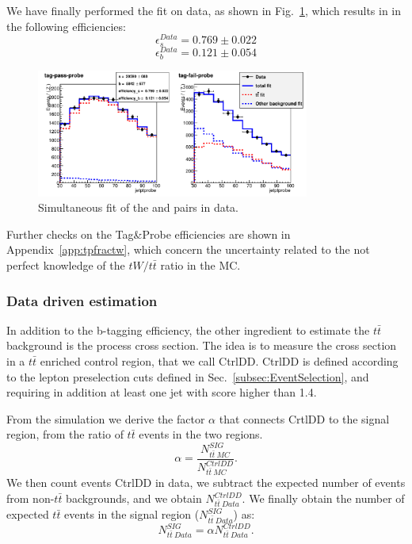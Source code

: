 We have finally performed the fit on data, as shown in Fig.~\ref{fig:data_tp}, which results in in the following efficiencies:
\begin{equation}
\epsilon_{s}^{Data}=0.769\pm0.022
\end{equation}
\begin{equation}
\epsilon_{b}^{Data}=0.121\pm0.054
\end{equation}

\begin{figure}[b]
\centering
\includegraphics[width=0.8\textwidth]{images/data_ptprobe.pdf}
\caption{Simultaneous fit of the \tpp{} and \tfp{} pairs in data.\label{fig:data_tp}}
\end{figure}
Further checks on the Tag\&Probe efficiencies are shown in Appendix~\ref{app:tpfractw}, which concern the uncertainty related to the not perfect knowledge of the $tW/t\bar{t}$ ratio in the MC.


\subsubsection{Data driven estimation \label{sec:DD}}
In addition to the b-tagging efficiency, the other ingredient to estimate the $t\bar{t}$ background is the process cross section. The idea is to measure the cross section in a $t\bar{t}$ enriched control region, that we call CtrlDD. CtrlDD is defined according to the lepton preselection cuts defined in Sec.~\ref{subsec:EventSelection}, and requiring in addition at least one jet with \jpb score higher than 1.4.

From the simulation we derive the factor $\alpha$ that connects CrtlDD to the signal region, from the ratio of $t\bar{t}$ events in the two regions.
\begin{equation}
\alpha=\frac{N_{t\bar{t}~MC}^{SIG}}{N_{t\bar{t}~MC}^{CtrlDD}}.
\end{equation}
We then count events CtrlDD in data, we subtract the expected number of events from non-$t\bar{t}$ backgrounds, and we obtain $N_{t\bar{t}~Data}^{CtrlDD}$. We finally obtain the number of expected $t\bar{t}$ events in the signal region ($N_{t\bar{t}~Data}^{SIG}$) as:
\begin{equation}
N_{t\bar{t}~Data}^{SIG} = \alpha{}N_{t\bar{t}~Data}^{CtrlDD}.
\end{equation}


